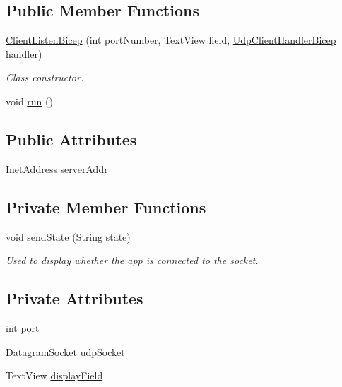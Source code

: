 \subsection*{Public Member Functions}
\begin{DoxyCompactItemize}
\item 
\mbox{\hyperlink{classcom_1_1example_1_1trainawearapplication_1_1_client_listen_bicep_a7a29935d4f0dd55a5dd0c0f5f93eba8c}{Client\+Listen\+Bicep}} (int port\+Number, Text\+View field, \mbox{\hyperlink{classcom_1_1example_1_1trainawearapplication_1_1_udp_client_handler_bicep}{Udp\+Client\+Handler\+Bicep}} handler)
\begin{DoxyCompactList}\small\item\em Class constructor. \end{DoxyCompactList}\item 
void \mbox{\hyperlink{classcom_1_1example_1_1trainawearapplication_1_1_client_listen_bicep_a00c62e73027050af19a527f480a9be15}{run}} ()
\end{DoxyCompactItemize}
\subsection*{Public Attributes}
\begin{DoxyCompactItemize}
\item 
Inet\+Address \mbox{\hyperlink{classcom_1_1example_1_1trainawearapplication_1_1_client_listen_bicep_a02882f0c88f5713407dbf2630e1909ff}{server\+Addr}}
\end{DoxyCompactItemize}
\subsection*{Private Member Functions}
\begin{DoxyCompactItemize}
\item 
void \mbox{\hyperlink{classcom_1_1example_1_1trainawearapplication_1_1_client_listen_bicep_a1a9854e6d93822ec317a1e4e2ef781cb}{send\+State}} (String state)
\begin{DoxyCompactList}\small\item\em Used to display whether the app is connected to the socket. \end{DoxyCompactList}\end{DoxyCompactItemize}
\subsection*{Private Attributes}
\begin{DoxyCompactItemize}
\item 
int \mbox{\hyperlink{classcom_1_1example_1_1trainawearapplication_1_1_client_listen_bicep_a5277e5a6fa795cd86dcc35b08952b17c}{port}}
\item 
Datagram\+Socket \mbox{\hyperlink{classcom_1_1example_1_1trainawearapplication_1_1_client_listen_bicep_aa43b7aebe53f1efa443f014fe5efc7ab}{udp\+Socket}}
\item 
Text\+View \mbox{\hyperlink{classcom_1_1example_1_1trainawearapplication_1_1_client_listen_bicep_a9634b0b5b3f74403071bf066606a0555}{display\+Field}}
\end{DoxyCompactItemize}


